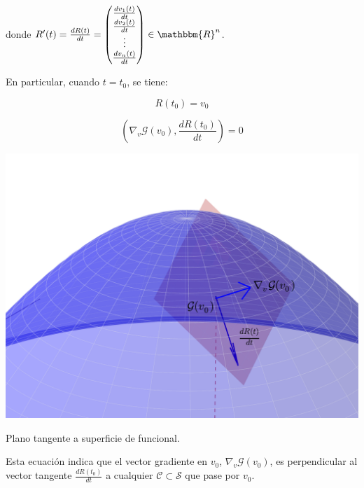                 donde $R'(t) = \frac{dR(t)}{dt} = \begin{pmatrix} \frac{d v_1(t)}{dt} \\ \frac{d v_2(t)}{dt} \\ \vdots \\ \frac{d v_n(t)}{dt} \end{pmatrix} \in \mathbbm{R}^n$.

                En particular, cuando $t = t_0$, se tiene:

                \begin{equation*}
                    R(t_0) = v_0
                \end{equation*}

                \begin{equation*}
                    \left( \nabla_v \mathscr{G}(v_0), \frac{dR(t_0)}{dt} \right) = 0
                \end{equation*}

                \begin{marginfigure}
                    \centering
                    \includegraphics[width=\textwidth]{./imagenes/superficie3dplano.pdf}
                    \caption{\label{fig:supplano}Plano tangente a superficie de funcional.}
                \end{marginfigure}

                Esta ecuación indica que el vector gradiente en $v_0$, $\nabla_v \mathscr{G}(v_0)$, es perpendicular al vector tangente $\frac{dR(t_0)}{dt}$ a cualquier $\mathscr{C} \subset \mathscr{S}$ que pase por $v_0$.

